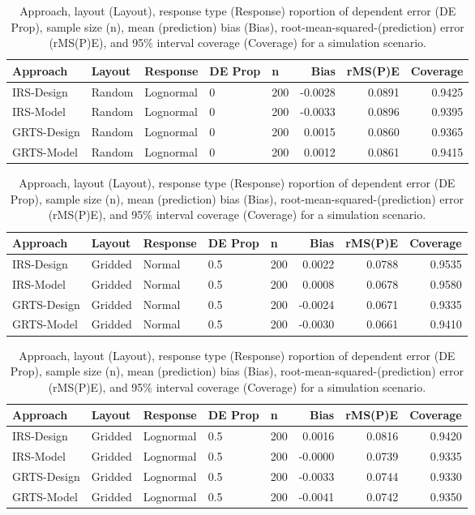 \documentclass[]{elsarticle} %
\begin{document}
\begin{table}[ht]
\centering
\begin{tabular}{lllllrrr}
  \hline
Approach & Layout & Response & DE Prop & n & Bias & rMS(P)E & Coverage \\ 
  \hline
IRS-Design & Random & Lognormal & 0 & 200 & -0.0028 & 0.0891 & 0.9425 \\ 
  IRS-Model & Random & Lognormal & 0 & 200 & -0.0033 & 0.0896 & 0.9395 \\ 
  GRTS-Design & Random & Lognormal & 0 & 200 & 0.0015 & 0.0860 & 0.9365 \\ 
  GRTS-Model & Random & Lognormal & 0 & 200 & 0.0012 & 0.0861 & 0.9415 \\ 
   \hline
\end{tabular}
\caption{Approach, layout (Layout), response type (Response) roportion of dependent error (DE Prop), sample size (n), mean (prediction) bias (Bias), root-mean-squared-(prediction) error (rMS(P)E), and 95\% interval coverage (Coverage) for a simulation scenario.} 
\end{table}
\begin{table}[ht]
\centering
\begin{tabular}{lllllrrr}
  \hline
Approach & Layout & Response & DE Prop & n & Bias & rMS(P)E & Coverage \\ 
  \hline
IRS-Design & Gridded & Normal & 0.5 & 200 & 0.0022 & 0.0788 & 0.9535 \\ 
  IRS-Model & Gridded & Normal & 0.5 & 200 & 0.0008 & 0.0678 & 0.9580 \\ 
  GRTS-Design & Gridded & Normal & 0.5 & 200 & -0.0024 & 0.0671 & 0.9335 \\ 
  GRTS-Model & Gridded & Normal & 0.5 & 200 & -0.0030 & 0.0661 & 0.9410 \\ 
   \hline
\end{tabular}
\caption{Approach, layout (Layout), response type (Response) roportion of dependent error (DE Prop), sample size (n), mean (prediction) bias (Bias), root-mean-squared-(prediction) error (rMS(P)E), and 95\% interval coverage (Coverage) for a simulation scenario.} 
\end{table}
\begin{table}[ht]
\centering
\begin{tabular}{lllllrrr}
  \hline
Approach & Layout & Response & DE Prop & n & Bias & rMS(P)E & Coverage \\ 
  \hline
IRS-Design & Gridded & Lognormal & 0.5 & 200 & 0.0016 & 0.0816 & 0.9420 \\ 
  IRS-Model & Gridded & Lognormal & 0.5 & 200 & -0.0000 & 0.0739 & 0.9335 \\ 
  GRTS-Design & Gridded & Lognormal & 0.5 & 200 & -0.0033 & 0.0744 & 0.9330 \\ 
  GRTS-Model & Gridded & Lognormal & 0.5 & 200 & -0.0041 & 0.0742 & 0.9350 \\ 
   \hline
\end{tabular}
\caption{Approach, layout (Layout), response type (Response) roportion of dependent error (DE Prop), sample size (n), mean (prediction) bias (Bias), root-mean-squared-(prediction) error (rMS(P)E), and 95\% interval coverage (Coverage) for a simulation scenario.} 
\end{table}
\end{document}
